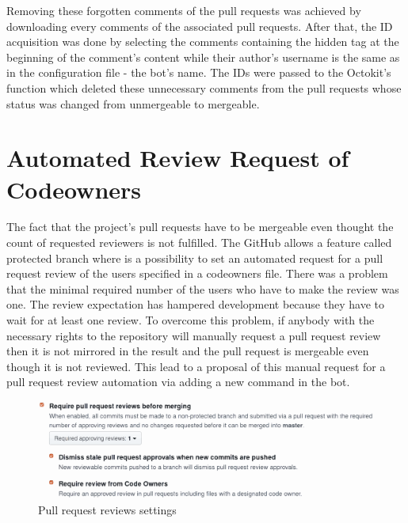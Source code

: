 Removing these forgotten comments of the pull requests was achieved by downloading every comments of the associated pull requests. After that, the ID acquisition was done by selecting the comments containing the hidden tag at the beginning of the comment's content while their author's username is the same as in the configuration file - the bot's name. The IDs were passed to the Octokit's function which deleted these unnecessary comments from the pull requests whose status was changed from unmergeable to mergeable.

\section{Automated Review Request of Codeowners}

The fact that the project's pull requests have to be mergeable even thought the count of requested reviewers is not fulfilled. The GitHub allows a feature called protected branch where is a possibility to set an automated request for a pull request review of the users specified in a codeowners file. There was a problem that the minimal required number of the users who have to make the review was one. The review expectation has hampered development because they have to wait for at least one review. To overcome this problem, if anybody with the necessary rights to the repository will manually request a pull request review then it is not mirrored in the result and the pull request is mergeable even though it is not reviewed. This lead to a proposal of this manual request for a pull request review automation via adding a new command in the bot.

\begin{figure}[H]
    \centering
    \includegraphics[scale=0.25]{img/codeowners_settings.pdf}
    \caption{Pull request reviews settings}
    \label{fig:codeowners_settings}
\end{figure}

